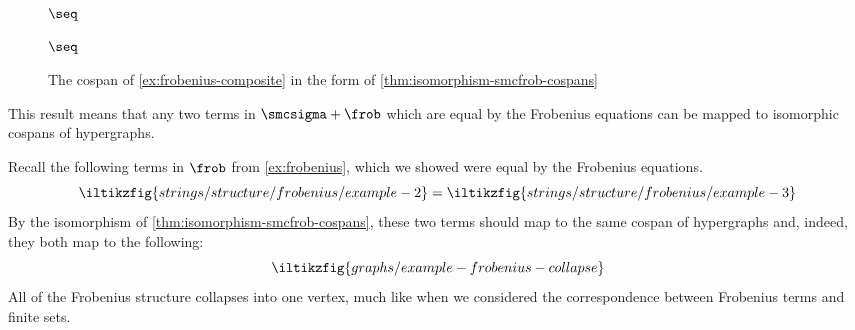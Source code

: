 \begin{figure}
    \centering
    \hspace{-1em}
    \(\seq\)
    \hspace{-1em}
    \hspace{-1em}
    \(\seq\)
    \hspace{-1em}
    \caption{
        The cospan of \cref{ex:frobenius-composite} in the form of
        \cref{thm:isomorphism-smcfrob-cospans}
    }
    \label{fig:frobenius-composite}
\end{figure}

This result means that any two terms in \(\smcsigma + \frob\) which are equal by
the Frobenius equations can be mapped to isomorphic cospans of hypergraphs.

\begin{example}
    Recall the following terms in \(\frob\) from \cref{ex:frobenius}, which
    we showed were equal by the Frobenius equations.
    \[
        \iltikzfig{strings/structure/frobenius/example-2}
        =
        \iltikzfig{strings/structure/frobenius/example-3}
    \]
    By the isomorphism of \cref{thm:isomorphism-smcfrob-cospans}, these two
    terms should map to the same cospan of hypergraphs and, indeed, they both
    map to the following:
    \[
        \iltikzfig{graphs/example-frobenius-collapse}
    \]
    All of the Frobenius structure collapses into one vertex, much like when we
    considered the correspondence between Frobenius terms and finite sets.
\end{example}

